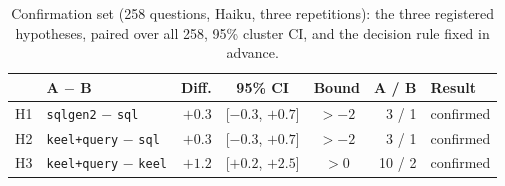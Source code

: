 \documentclass[sigconf, nonacm]{acmart}
\newcommand{\code}[1]{\texttt{#1}}
\begin{document}
\begin{table}[t]
\caption{Confirmation set (258 questions, Haiku, three repetitions): the three registered hypotheses, paired over all 258, 95\% cluster CI, and the decision rule fixed in advance.}
\label{tab:hyp}
\centering
\footnotesize
\setlength{\tabcolsep}{2.8pt}
\begin{tabular}{l l r c c r l}
\toprule
& A $-$ B & Diff. & 95\% CI & Bound & A / B & Result \\
\midrule
H1 & \code{sqlgen2} $-$ \code{sql} & $+0.3$ & [$-0.3$, $+0.7$] & $> -2$ & 3 / 1 & confirmed \\
H2 & \code{keel+query} $-$ \code{sql} & $+0.3$ & [$-0.3$, $+0.7$] & $> -2$ & 3 / 1 & confirmed \\
H3 & \code{keel+query} $-$ \code{keel} & $+1.2$ & [$+0.2$, $+2.5$] & $> 0$ & 10 / 2 & confirmed \\
\bottomrule
\end{tabular}
\end{table}
\end{document}
